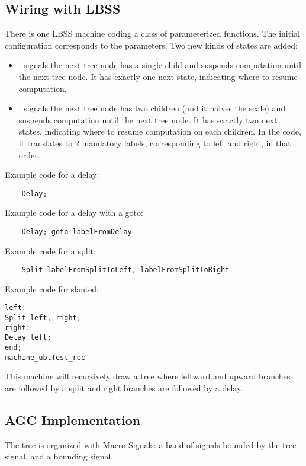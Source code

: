 \subsection{Wiring with LBSS}

There is one LBSS machine coding a class of parameterized functions.
The initial configuration corresponds to the parameters.
Two new kinds of states are added:

\begin{itemize}
	\item \Delay: signals the next tree node has a single child and suspends computation until the next tree node.
	It has exactly one next state, indicating where to resume computation.
	\item \Split: signals the next tree node has two children (and it halves the scale) and suspends computation until the next tree node.
	It has exactly two next states, indicating where to resume computation on each children.
	In the code, it translates to 2 mandatory labels, corresponding to left and right, in that order.
\end{itemize}

Example code for a delay:
\begin{verbatim}
	Delay;
\end{verbatim}

Example code for a delay with a goto:
\begin{verbatim}
	Delay; goto labelFromDelay
\end{verbatim}

Example code for a split:
\begin{verbatim}
	Split labelFromSplitToLeft, labelFromSplitToRight
\end{verbatim}

Example code for slanted:
\begin{verbatim}
left:
Split left, right;
right:
Delay left;
end;
machine_ubtTest_rec
\end{verbatim}
This machine will recursively draw a tree where leftward and upward branches are followed by a split and right branches are followed by a delay.

\subsection{AGC Implementation}
The tree is organized with Macro Signals: a band of signals bounded by the tree signal, and a bounding signal.

